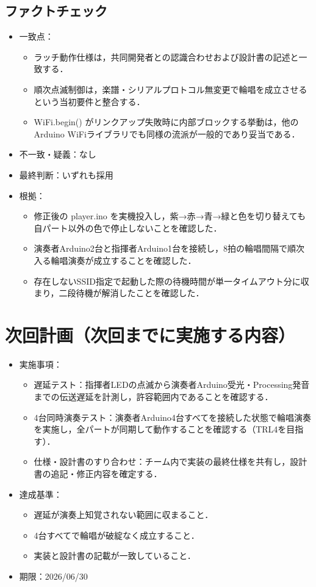 \documentclass[lualatex,paper=a4paper,jafontsize=11.5pt,jafontscale=1.05]{jlreq}
\begin{document}
\subsection{ファクトチェック}
\begin{itemize}
  \item 一致点：
  \begin{itemize}
    \item ラッチ動作仕様は，共同開発者との認識合わせおよび設計書の記述と一致する．
    \item 順次点滅制御は，楽譜・シリアルプロトコル無変更で輪唱を成立させるという当初要件と整合する．
    \item WiFi.begin() がリンクアップ失敗時に内部ブロックする挙動は，他のArduino WiFiライブラリでも同様の流派が一般的であり妥当である．
  \end{itemize}
  \item 不一致・疑義：なし
  \item 最終判断：いずれも採用
  \item 根拠：
  \begin{itemize}
    \item 修正後の player.ino を実機投入し，紫→赤→青→緑と色を切り替えても自パート以外の色で停止しないことを確認した．
    \item 演奏者Arduino2台と指揮者Arduino1台を接続し，8拍の輪唱間隔で順次入る輪唱演奏が成立することを確認した．
    \item 存在しないSSID指定で起動した際の待機時間が単一タイムアウト分に収まり，二段待機が解消したことを確認した．
  \end{itemize}
\end{itemize}

\section{次回計画（次回までに実施する内容）}
\begin{itemize}
  \item 実施事項：
  \begin{itemize}
    \item 遅延テスト：指揮者LEDの点滅から演奏者Arduino受光・Processing発音までの伝送遅延を計測し，許容範囲内であることを確認する．
    \item 4台同時演奏テスト：演奏者Arduino4台すべてを接続した状態で輪唱演奏を実施し，全パートが同期して動作することを確認する（TRL4を目指す）．
    \item 仕様・設計書のすり合わせ：チーム内で実装の最終仕様を共有し，設計書の追記・修正内容を確定する．
  \end{itemize}
  \item 達成基準：
  \begin{itemize}
    \item 遅延が演奏上知覚されない範囲に収まること．
    \item 4台すべてで輪唱が破綻なく成立すること．
    \item 実装と設計書の記載が一致していること．
  \end{itemize}
  \item 期限：2026/06/30
\end{itemize}
\end{document}
